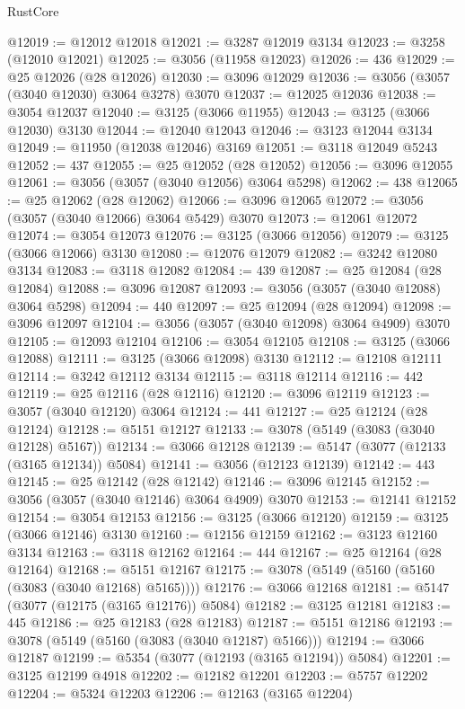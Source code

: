 \begin{lexlean}{RustCore}
\begin{coremodule}
@12019 := @12012 @12018
@12021 := @3287 @12019 @3134
@12023 := @3258 (@12010 @12021)
@12025 := @3056 (@11958 @12023)
@12026 := 436
@12029 := @25 @12026 (@28 @12026)
@12030 := @3096 @12029
@12036 := @3056 (@3057 (@3040 @12030) @3064 @3278) @3070
@12037 := @12025 @12036
@12038 := @3054 @12037
@12040 := @3125 (@3066 @11955)
@12043 := @3125 (@3066 @12030) @3130
@12044 := @12040 @12043
@12046 := @3123 @12044 @3134
@12049 := @11950 (@12038 @12046) @3169
@12051 := @3118 @12049 @5243
@12052 := 437
@12055 := @25 @12052 (@28 @12052)
@12056 := @3096 @12055
@12061 := @3056 (@3057 (@3040 @12056) @3064 @5298)
@12062 := 438
@12065 := @25 @12062 (@28 @12062)
@12066 := @3096 @12065
@12072 := @3056 (@3057 (@3040 @12066) @3064 @5429) @3070
@12073 := @12061 @12072
@12074 := @3054 @12073
@12076 := @3125 (@3066 @12056)
@12079 := @3125 (@3066 @12066) @3130
@12080 := @12076 @12079
@12082 := @3242 @12080 @3134
@12083 := @3118 @12082
@12084 := 439
@12087 := @25 @12084 (@28 @12084)
@12088 := @3096 @12087
@12093 := @3056 (@3057 (@3040 @12088) @3064 @5298)
@12094 := 440
@12097 := @25 @12094 (@28 @12094)
@12098 := @3096 @12097
@12104 := @3056 (@3057 (@3040 @12098) @3064 @4909) @3070
@12105 := @12093 @12104
@12106 := @3054 @12105
@12108 := @3125 (@3066 @12088)
@12111 := @3125 (@3066 @12098) @3130
@12112 := @12108 @12111
@12114 := @3242 @12112 @3134
@12115 := @3118 @12114
@12116 := 442
@12119 := @25 @12116 (@28 @12116)
@12120 := @3096 @12119
@12123 := @3057 (@3040 @12120) @3064
@12124 := 441
@12127 := @25 @12124 (@28 @12124)
@12128 := @5151 @12127
@12133 := @3078 (@5149 (@3083 (@3040 @12128) @5167))
@12134 := @3066 @12128
@12139 := @5147 (@3077 (@12133 (@3165 @12134)) @5084)
@12141 := @3056 (@12123 @12139)
@12142 := 443
@12145 := @25 @12142 (@28 @12142)
@12146 := @3096 @12145
@12152 := @3056 (@3057 (@3040 @12146) @3064 @4909) @3070
@12153 := @12141 @12152
@12154 := @3054 @12153
@12156 := @3125 (@3066 @12120)
@12159 := @3125 (@3066 @12146) @3130
@12160 := @12156 @12159
@12162 := @3123 @12160 @3134
@12163 := @3118 @12162
@12164 := 444
@12167 := @25 @12164 (@28 @12164)
@12168 := @5151 @12167
@12175 := @3078 (@5149 (@5160 (@5160 (@3083 (@3040 @12168) @5165))))
@12176 := @3066 @12168
@12181 := @5147 (@3077 (@12175 (@3165 @12176)) @5084)
@12182 := @3125 @12181
@12183 := 445
@12186 := @25 @12183 (@28 @12183)
@12187 := @5151 @12186
@12193 := @3078 (@5149 (@5160 (@3083 (@3040 @12187) @5166)))
@12194 := @3066 @12187
@12199 := @5354 (@3077 (@12193 (@3165 @12194)) @5084)
@12201 := @3125 @12199 @4918
@12202 := @12182 @12201
@12203 := @5757 @12202
@12204 := @5324 @12203
@12206 := @12163 (@3165 @12204)

\end{coremodule}
\end{lexlean}
